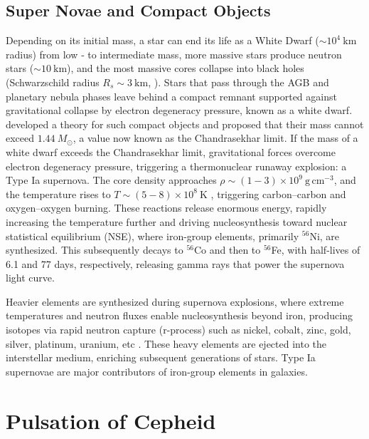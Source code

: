 \subsection{Super Novae and Compact Objects}
Depending on its initial mass, a star can end its life as a White Dwarf ($\sim 10^4~\mathrm{km}$ radius) from low ‑ to intermediate mass, more massive stars produce neutron stars ($\sim 10~\mathrm{km}$), and the most massive cores collapse into black holes (Schwarzschild radius $R_s \sim 3~\mathrm{km}$, \citep{ShapiroTeukolsky1983, LattimerPrakash2004, MisnerThorneWheeler1973}). Stars that pass through the AGB and planetary nebula phases leave behind a compact remnant supported against gravitational collapse by electron degeneracy pressure, known as a white dwarf. \cite{1931chandrasekhar} developed a theory for such compact objects and proposed that their mass cannot exceed $1.44~M_\odot$, a value now known as the Chandrasekhar limit. If the mass of a white dwarf exceeds the Chandrasekhar limit, gravitational forces overcome electron degeneracy pressure, triggering a thermonuclear runaway explosion: a Type Ia supernova. The core density approaches $\rho \sim (1-3) \times 10^9~\mathrm{g\,cm^{-3}}$, and the temperature rises to $T \sim (5-8) \times 10^8~\mathrm{K}$ \citep{woosley2002}, triggering carbon–carbon and oxygen–oxygen burning. These reactions release enormous energy, rapidly increasing the temperature further and driving nucleosynthesis toward nuclear statistical equilibrium (NSE), where iron-group elements, primarily $^{56}$Ni, are synthesized. This subsequently decays to $^{56}$Co and then to $^{56}$Fe, with half-lives of 6.1 and 77 days, respectively, releasing gamma rays that power the supernova light curve.



Heavier elements are synthesized during supernova explosions, where extreme temperatures and neutron fluxes enable nucleosynthesis beyond iron, producing isotopes via rapid neutron capture (r-process) such as nickel, cobalt, zinc, gold, silver, platinum, uranium, etc \citep{woosley2007}. These heavy elements are ejected into the interstellar medium, enriching subsequent generations of stars. Type Ia supernovae are major contributors of iron-group elements in galaxies. 







\section{Pulsation of Cepheid}


